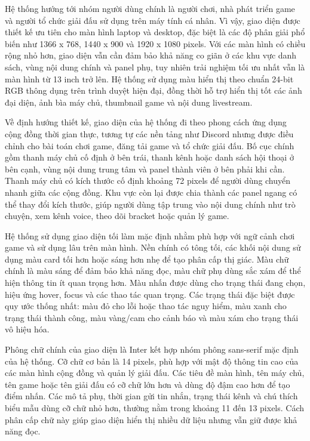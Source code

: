 Hệ thống hướng tới nhóm người dùng chính là người chơi, nhà phát triển game và người tổ chức giải đấu sử dụng trên máy tính cá nhân. Vì vậy, giao diện được thiết kế ưu tiên cho màn hình laptop và desktop, đặc biệt là các độ phân giải phổ biến như 1366 x 768, 1440 x 900 và 1920 x 1080 pixels. Với các màn hình có chiều rộng nhỏ hơn, giao diện vẫn cần đảm bảo khả năng co giãn ở các khu vực danh sách, vùng nội dung chính và panel phụ, tuy nhiên trải nghiệm tối ưu nhất vẫn là màn hình từ 13 inch trở lên. Hệ thống sử dụng màu hiển thị theo chuẩn 24-bit RGB thông dụng trên trình duyệt hiện đại, đồng thời hỗ trợ hiển thị tốt các ảnh đại diện, ảnh bìa máy chủ, thumbnail game và nội dung livestream.

Về định hướng thiết kế, giao diện của hệ thống đi theo phong cách ứng dụng cộng đồng thời gian thực, tương tự các nền tảng như Discord nhưng được điều chỉnh cho bài toán chơi game, đăng tải game và tổ chức giải đấu. Bố cục chính gồm thanh máy chủ cố định ở bên trái, thanh kênh hoặc danh sách hội thoại ở bên cạnh, vùng nội dung trung tâm và panel thành viên ở bên phải khi cần. Thanh máy chủ có kích thước cố định khoảng 72 pixels để người dùng chuyển nhanh giữa các cộng đồng. Khu vực còn lại được chia thành các panel ngang có thể thay đổi kích thước, giúp người dùng tập trung vào nội dung chính như trò chuyện, xem kênh voice, theo dõi bracket hoặc quản lý game.

Hệ thống sử dụng giao diện tối làm mặc định nhằm phù hợp với ngữ cảnh chơi game và sử dụng lâu trên màn hình. Nền chính có tông tối, các khối nội dung sử dụng màu card tối hơn hoặc sáng hơn nhẹ để tạo phân cấp thị giác. Màu chữ chính là màu sáng để đảm bảo khả năng đọc, màu chữ phụ dùng sắc xám để thể hiện thông tin ít quan trọng hơn. Màu nhấn được dùng cho trạng thái đang chọn, hiệu ứng hover, focus và các thao tác quan trọng. Các trạng thái đặc biệt được quy ước thống nhất: màu đỏ cho lỗi hoặc thao tác nguy hiểm, màu xanh cho trạng thái thành công, màu vàng/cam cho cảnh báo và màu xám cho trạng thái vô hiệu hóa.

Phông chữ chính của giao diện là Inter kết hợp nhóm phông sans-serif mặc định của hệ thống. Cỡ chữ cơ bản là 14 pixels, phù hợp với mật độ thông tin cao của các màn hình cộng đồng và quản lý giải đấu. Các tiêu đề màn hình, tên máy chủ, tên game hoặc tên giải đấu có cỡ chữ lớn hơn và dùng độ đậm cao hơn để tạo điểm nhấn. Các mô tả phụ, thời gian gửi tin nhắn, trạng thái kênh và chú thích biểu mẫu dùng cỡ chữ nhỏ hơn, thường nằm trong khoảng 11 đến 13 pixels. Cách phân cấp chữ này giúp giao diện hiển thị nhiều dữ liệu nhưng vẫn giữ được khả năng đọc.

